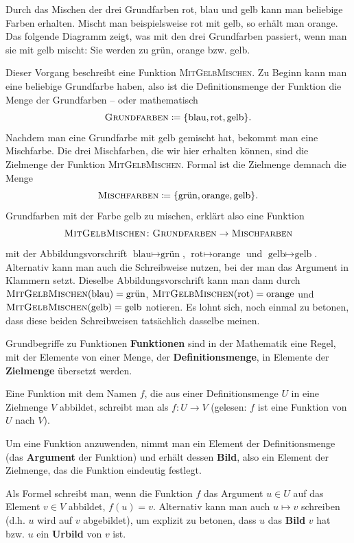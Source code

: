 \documentclass[../../main.tex]{subfiles}
\begin{document}
\begin{example}{}
    Durch das Mischen der drei Grundfarben rot, blau und gelb kann man beliebige Farben erhalten. Mischt man beispielsweise rot mit gelb, so erhält man orange. Das folgende Diagramm zeigt, was mit den drei Grundfarben passiert, wenn man sie mit gelb mischt: Sie werden zu grün, orange bzw. gelb.
    \begin{center}
    \end{center}
    Dieser Vorgang beschreibt eine Funktion \textsc{MitGelbMischen}. Zu Beginn kann man eine beliebige Grundfarbe haben, also ist die Definitionsmenge der Funktion die Menge der Grundfarben -- oder mathematisch \[\textsc{Grundfarben}\coloneqq\{\text{blau},\text{rot},\text{gelb}\}.\]
    Nachdem man eine Grundfarbe mit gelb gemischt hat, bekommt man eine Mischfarbe. Die drei Mischfarben, die wir hier erhalten können, sind die Zielmenge der Funktion \textsc{MitGelbMischen}. Formal ist die Zielmenge demnach die Menge \[\textsc{Mischfarben}\coloneqq\{\text{grün},\text{orange},\text{gelb}\}.\]
    Grundfarben mit der Farbe gelb zu mischen, erklärt also eine Funktion \[\textsc{MitGelbMischen}\colon\textsc{Grundfarben}\rightarrow\textsc{Mischfarben}\] mit der Abbildungsvorschrift $\text{blau}\mapsto\text{grün}$, $\text{rot}\mapsto\text{orange}$ und $\text{gelb}\mapsto\text{gelb}$. Alternativ kann man auch die Schreibweise nutzen, bei der man das Argument in Klammern setzt. Dieselbe Abbildungsvorschrift kann man dann durch $\textsc{MitGelbMischen}(\text{blau})=\text{grün}$, $\textsc{MitGelbMischen}(\text{rot})=\text{orange}$ und $\textsc{MitGelbMischen}(\text{gelb})=\text{gelb}$ notieren. Es lohnt sich, noch einmal zu betonen, dass diese beiden Schreibweisen tatsächlich dasselbe meinen.
\end{example}

\begin{nutshell}{Grundbegriffe zu Funktionen}
    \parpic[r]{
    }
    \textbf{Funktionen} sind in der Mathematik eine Regel, mit der Elemente von einer Menge, der \textbf{Definitionsmenge}, in Elemente der \textbf{Zielmenge} übersetzt werden.
    
    Eine Funktion mit dem Namen $f$, die aus einer Definitionsmenge $U$ in eine Zielmenge $V$ abbildet, schreibt man als $f\colon U\rightarrow V$ (gelesen: $f$ ist eine Funktion von $U$ nach $V$).
    
    Um eine Funktion anzuwenden, nimmt man ein Element der Definitionsmenge (das \textbf{Argument} der Funktion) und erhält dessen \textbf{Bild}, also ein Element der Zielmenge, das die Funktion eindeutig festlegt. 
    
    Als Formel schreibt man, wenn die Funktion $f$ das Argument $u\in U$ auf das Element $v\in V$ abbildet, $f(u)=v$. Alternativ kann man auch $u\mapsto v$ schreiben (d.h. $u$ wird auf $v$ abgebildet), um explizit zu betonen, dass $u$ das \textbf{Bild} $v$ hat bzw. $u$ ein \textbf{Urbild} von $v$ ist.
\end{nutshell}
\end{document}
